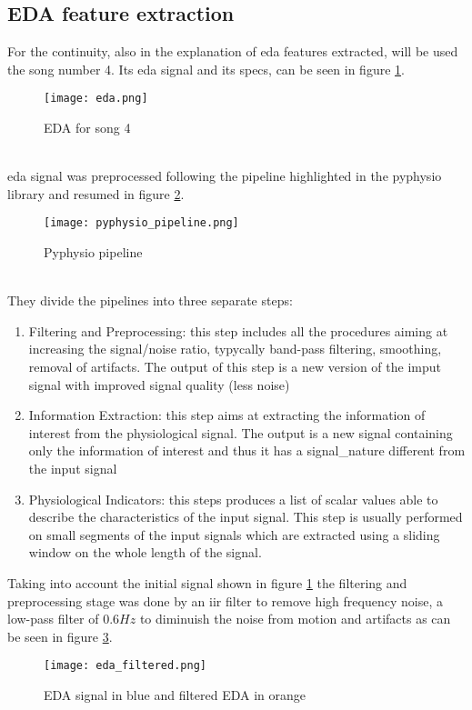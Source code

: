 \subsection{EDA feature extraction}
For the continuity, also in the explanation of \gls{eda} features extracted, will be used the song number 4. Its \gls{eda} signal and its specs, can be seen in figure \ref{fig:eda}.
\begin{figure}[h]
    \centering
    \texttt{[image: eda.png]} 
	\caption{EDA for song 4}
    \label{fig:eda}
\end{figure}
\\
\gls{eda} signal was preprocessed following the pipeline highlighted in the pyphysio library \cite{bizzego2019pyphysio} and resumed in figure \ref{fig:pyphysio_pipeline}.
\begin{figure}[h]
    \centering
    \texttt{[image: pyphysio\_pipeline.png]} 
	\caption{Pyphysio pipeline}
    \label{fig:pyphysio_pipeline}
\end{figure}
\\
They divide the pipelines into three separate steps:
\begin{enumerate}
	\item Filtering and Preprocessing: this step includes all the procedures aiming at increasing the signal/noise ratio, typycally band-pass filtering, smoothing, removal of artifacts. The output of this step is a new version of the imput signal with improved signal quality (less noise)
	\item Information Extraction: this step aims at extracting the information of interest from the physiological signal. The output is a new signal containing only the information of interest and thus it has a signal\_nature different from the input signal
	\item Physiological Indicators: this steps produces a list of scalar values able to describe the characteristics of the input signal. This step is usually performed on small segments of the input signals which are extracted using a sliding window on the whole length of the signal.
\end{enumerate}
Taking into account the initial signal shown in figure \ref{fig:eda} the filtering and preprocessing stage was done by an \gls{iir} filter to remove high frequency noise, a low-pass filter of $0.6Hz$ to diminuish the noise from motion and artifacts as can be seen in figure \ref{fig:eda_filtered}.
\begin{figure}[h]
    \centering
    \texttt{[image: eda\_filtered.png]} 
	\caption{EDA signal in blue and filtered EDA in orange}
    \label{fig:eda_filtered}
\end{figure}
